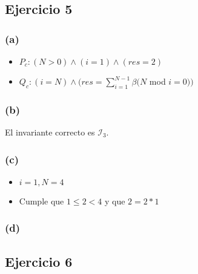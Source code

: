 \documentclass[12 pt]{article}
\begin{document}
\subsection*{Ejercicio 5}
    \subsubsection*{(a)}
        \begin{itemize}
            \item $P_{c}: (N > 0) \wedge (i = 1) \wedge (res = 2)$
            \item $Q_{c}: (i = N) \wedge (res = \sum^{N - 1}_{i = 1}\beta(N$ mod $i = 0))$
        \end{itemize}
    \subsubsection*{(b)}
        El invariante correcto es $\mathcal{I}_{3}$.
    \subsubsection*{(c)}
        \begin{itemize}
            \item $i = 1, N = 4$
            \item Cumple que $1 \leq 2 < 4$ y que $2 = 2 * 1$
        \end{itemize}
    \subsubsection*{(d)}

\subsection*{Ejercicio 6}
\end{document}
